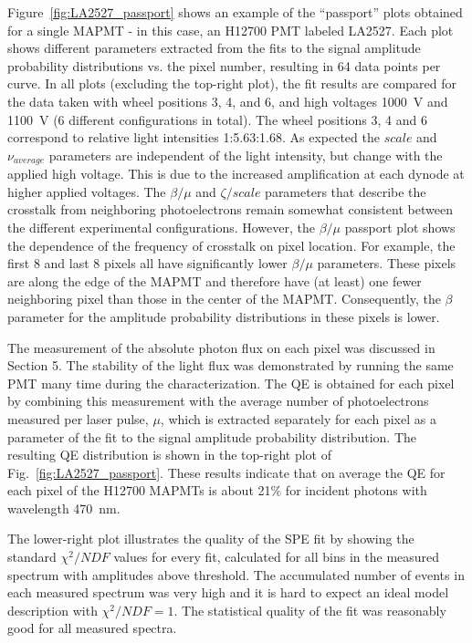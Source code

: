 Figure~\ref{fig:LA2527_passport} shows an example of the ``passport'' plots obtained for a single MAPMT - in this case, an H12700 PMT labeled LA2527. 
Each plot shows different parameters extracted from the fits to the signal amplitude probability distributions vs. the pixel number, resulting in 64 data points per curve.
In all plots (excluding the top-right plot), the fit results are compared for the data taken with wheel positions 3, 4, and 6, and high voltages 1000~V and 1100~V (6 different configurations in total).
The wheel positions 3, 4 and 6 correspond to relative light intensities 1:5.63:1.68.
As expected the $scale$ and $\nu_{average}$ parameters are independent of the light intensity, but change with the applied high voltage. 
This is due to the increased amplification at each dynode at higher applied voltages.
The $\beta/\mu$ and $\zeta/scale$ parameters that describe the crosstalk from neighboring photoelectrons remain somewhat consistent between the different experimental configurations. 
However, the $\beta/\mu$ passport plot shows the dependence of the frequency of crosstalk on pixel location. For example, the first 8 and last 8 pixels all have significantly lower $\beta/\mu$ parameters. These pixels are along the edge of the MAPMT and therefore have (at least) one fewer neighboring pixel than those in the center of the MAPMT.
Consequently, the $\beta$ parameter for the amplitude probability distributions in these pixels is lower. 

The measurement of the absolute photon flux on each pixel was discussed in Section 5. 
The stability of the light flux was demonstrated by running the same PMT many time during the characterization.
The QE is obtained for each pixel by combining this measurement with the average number of photoelectrons measured per laser pulse, $\mu$, which is extracted separately for each pixel as a parameter of the fit to the signal amplitude probability distribution. The resulting QE distribution is shown in the top-right plot of Fig.~\ref{fig:LA2527_passport}. These results indicate that on average the QE for each pixel of the H12700 MAPMTs is about 21$\%$ for incident photons with wavelength 470~nm.

The lower-right plot illustrates the quality of the SPE fit by showing the standard $\chi^2/NDF$ values for every fit, calculated for all bins in the measured spectrum with amplitudes above threshold. The accumulated number of events in each measured spectrum was very high and it is hard to expect an ideal model description with $\chi^2/NDF = 1$. The statistical quality of the fit was reasonably good for all measured spectra.

